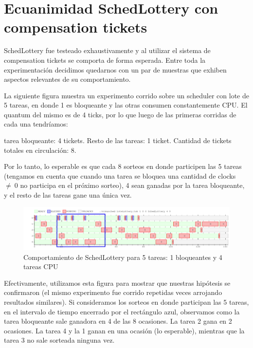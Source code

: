 \section{Ecuanimidad SchedLottery con compensation tickets}

SchedLottery fue testeado exhaustivamente y al utilizar el sistema de compensation tickets se comporta de forma esperada. Entre toda la experimentación
decidimos quedarnos con un par de muestras que exhiben aspectos relevantes de su comportamiento.

La siguiente figura muestra un experimento corrido sobre un scheduler con lote de 5 tareas, en donde 1 es bloqueante y las otras consumen constantemente CPU. 
El quantum del mismo es de 4 ticks, por lo que luego de las primeras corridas de cada una tendríamos: 

tarea bloqueante: 4 tickets. Resto de las tareas: 1 ticket. Cantidad de tickets totales en circulación: 8. 

Por lo tanto, lo esperable es que cada 8 sorteos en donde participen las 5 tareas (tengamos en cuenta que cuando una tarea se bloquea una cantidad de clocks $\neq \ 0$ no 
participa en el próximo sorteo), 4 sean ganadas por la tarea bloqueante, y el resto de las tareas gane una única vez.

\begin{figure}[!h]
	\begin{center}
		  \includegraphics[scale=0.5]{Graficos/intervalo_8.png}
		  \caption{Comportamiento de SchedLottery para 5 tareas: 1 bloqueantes y 4 tareas CPU }
		  \label{fig:contra1}
	\end{center}
\end{figure}
\FloatBarrier

Efectivamente, utilizamos esta figura para mostrar que nuestras hipótesis se confirmaron (el mismo experimento fue corrido repetidas veces arrojando resultados similares).
Si consideramos los sorteos en donde participan las 5 tareas, en el intervalo de tiempo encerrado por el rectángulo azul, observamos como la tarea bloqueante sale
ganadora en 4 de las 8 ocasiones. La tarea 2 gana en 2 ocasiones. La tarea 4 y la 1 ganan en una ocasión (lo esperable), mientras que la tarea 3 no sale sorteada ninguna vez.
